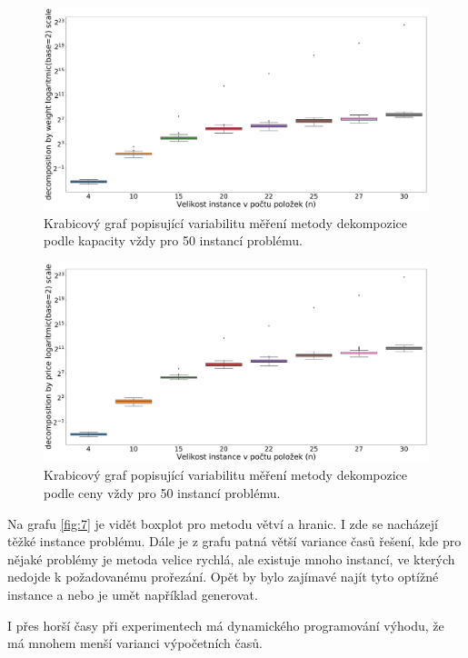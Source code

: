 \documentclass[11pt]{article}
\begin{document}
\begin{figure}[h]\centering
	\includegraphics[scale=0.2]{img/boxDW}
 	\caption[2]{Krabicový graf popisující variabilitu měření metody dekompozice podle kapacity vždy pro 50 instancí problému.}\label{fig:5}
 \end{figure} 	
 \begin{figure}[h]\centering
	\includegraphics[scale=0.2]{img/boxDC}
 	\caption[2]{Krabicový graf popisující variabilitu měření metody dekompozice podle ceny vždy pro 50 instancí problému.}\label{fig:6}
 \end{figure}

Na grafu \ref{fig:7} je vidět boxplot pro metodu větví a hranic. I zde se nacházejí těžké instance problému. Dále je z grafu patná větší variance časů řešení, kde pro nějaké problémy je metoda velice rychlá, ale existuje mnoho instancí, ve kterých nedojde k požadovanému prořezání. Opět by bylo zajímavé najít tyto optížné instance a nebo je umět například generovat.

I přes horší časy při experimentech má dynamického programování výhodu, že má mnohem menší varianci výpočetních časů.
\end{document}
